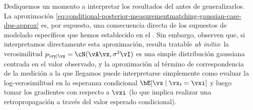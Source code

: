 \documentclass[../../book-main_es.tex]{subfiles}
\begin{document}
Dediquemos un momento a interpretar los resultados del
 antes de generalizarlos.
La aproximación
\eqref{eq:conditional-posterior-measurementmatching-gaussian-case-dps-approx}
es, por supuesto, una consecuencia directa de los supuestos de modelado específicos que hemos
establecido en el . Sin embargo, observen
que, si interpretamos directamente esta aproximación, resulta tratable \textit{ab initio}:
la verosimilitud $p_{\vy \mid \vx} = \cN(\vA\vx, \sigma^2 \vI)$ es
una simple distribución gaussiana centrada en el valor observado, y la
aproximación al término de correspondencia de la medición a la que llegamos puede
interpretarse simplemente como evaluar la log-verosimilitud en la
esperanza condicional $\bE[\vx \mid \vx_t = \vxi]$ y luego tomar los gradientes con respecto
a $\vxi$ (lo que implica realizar una retropropagación a través del valor esperado condicional).
\end{document}
